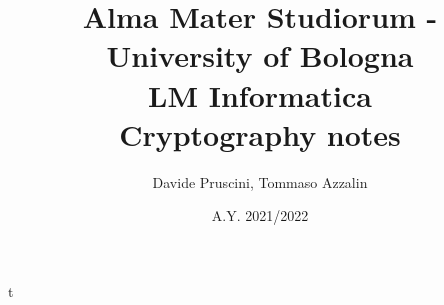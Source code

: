 \documentclass[11pt]{book}
\title{Alma Mater Studiorum - University of Bologna \\ LM Informatica \\ \textbf{Cryptography notes}}
\author{Davide Pruscini, Tommaso Azzalin}
\date{A.Y. 2021/2022}
\begin{document}
\maketitle

\tableofcontents
\clearpage


\clearpage
t

\clearpage


\clearpage


\clearpage


\clearpage


\clearpage


\clearpage


\clearpage


\clearpage
\end{document}
